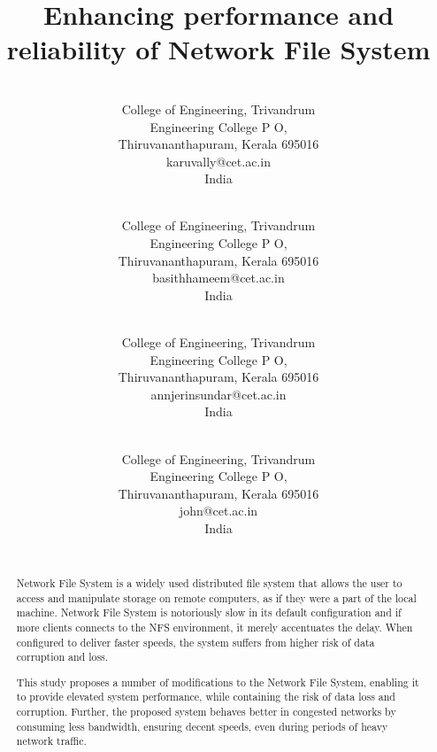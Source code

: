 \documentclass[conference]{IEEEtran}
\begin{document}
\title{Enhancing performance and reliability of Network File System\\
}

\author{
\\
College of Engineering, Trivandrum \\
Engineering College P O,\\
Thiruvananthapuram, Kerala 695016 \\
karuvally@cet.ac.in\\
India\\
\and {}\\
College of Engineering, Trivandrum \\
Engineering College P O,\\
Thiruvananthapuram, Kerala 695016 \\
basithhameem@cet.ac.in\\
India\\
\and {}\\
College of Engineering, Trivandrum \\
Engineering College P O,\\
Thiruvananthapuram, Kerala 695016 \\
annjerinsundar@cet.ac.in\\
India\\
\and {}\\
College of Engineering, Trivandrum \\
Engineering College P O,\\
Thiruvananthapuram, Kerala 695016 \\
john@cet.ac.in\\
India\\
\\
}
\maketitle

\begin{abstract}
Network File System is a widely used distributed file system that allows the
user to access and manipulate storage on remote computers, as if they were a
part of the local machine. Network File System is notoriously slow in its 
default configuration and if more clients connects to the NFS environment,
it merely accentuates the delay. When configured to deliver faster speeds,
the system suffers from higher risk of data corruption and loss.

This study proposes a number of modifications to the Network File System,
enabling it to provide elevated system performance, while containing
the risk of data loss and corruption. Further, the proposed system behaves
better in congested networks by consuming less bandwidth, ensuring decent
speeds, even during periods of heavy network traffic.
\end{abstract}
\end{document}
